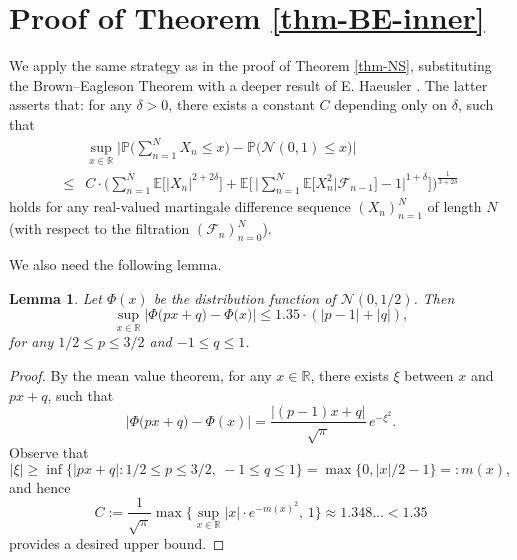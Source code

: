 \documentclass[11pt, reqno]{amsart}
\newtheorem{lemma}[theorem]{Lemma}
\theoremstyle{definition}
\newtheorem*{Brown-Eagleson Theorem}{The Brown-Eagleson Theorem}
\newcommand{\R}{\mathbb R}
\newcommand{\E}{\mathbb E}
\newcommand{\PP}{\mathbb P}
\newcommand{\cal}{\mathcal}
\begin{document}
	



	





	\section{Proof of Theorem \ref{thm-BE-inner}}




We apply the same strategy as in the proof of Theorem \ref{thm-NS}, substituting the Brown--Eagleson Theorem with a deeper result of E. Haeusler \cite[Theorem 1]{Hae88}. The latter asserts that: for any $\delta>0$, there exists a constant $C$ depending only on $\delta$, such that
\begin{align*}
	&\sup_{x\in \R}\bigg| \PP\Big( \sum_{n=1}^N X_n\leq x \Big) - \PP \Big(\cal N(0,1) \leq x \Big)\bigg| \\
	\leq & C\cdot  \bigg( \sum_{n=1}^N \E\big[ |X_n|^{2+2\delta}\big]+ \E\bigg[\, \bigg|\sum_{n=1}^N \E\big[ X_n^2 | \cal F_{n-1}\big] -1\bigg|^{1+\delta}\bigg]\bigg)^{\frac{1}{3+2\delta}}
\end{align*}
holds for any real-valued martingale difference sequence $(X_n)_{n=1}^N$ of length $N$ (with respect to the filtration $(\cal F_n)^N_{n=0}$).

We also need the following lemma. 
\begin{lemma}\label{lem-normal-ball-probability}
	Let $\Phi(x)$ be the distribution function of $\mathcal N(0,1/2)$. Then
	$$
	\sup_{x\in \R}\bigg| \Phi\big(px+q\big) - \Phi\big(x\big)\bigg|
	\leq 1.35 \cdot (|p-1|+|q|),
	$$
	for any $1/2\leq p\leq 3/2$ and $-1\leq q \leq 1$.
\end{lemma}

\begin{proof} 
	By the mean value theorem, for any $x\in \R$, there exists $\xi$ between $x$ and $px+q$, such that
	$$
	\Big|\Phi\big(px+q\big)- \Phi(x)\Big|
	= \frac{|(p-1)x+q|}{\sqrt{\pi}} \,e^{-\xi^2}.
	$$
	Observe that
	$$
	|\xi|\geq \inf \big\{|px+q|: 1/2 \leq p \leq 3/2,\ -1\leq q \leq 1\big\}
	=\max\big\{0,|x|/2 -1 \big\}=: m(x),
	$$
	and hence
	$$
	C:= \frac{1}{\sqrt{\pi}}\max \bigg\{ \sup_{x\in \R} |x|\cdot e^{-m(x)^2}, \, 1\bigg\}\approx 1.348... <1.35 
	$$
	provides a desired upper bound.
\end{proof}
\end{document}
